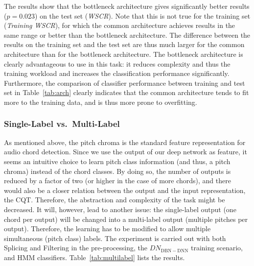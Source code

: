 \documentclass{article}
\begin{document}
The results show that the bottleneck architecture gives significantly better results ($p=0.023$) on the test set (\textit{WSCR}). Note that this is not true for the training set (\textit{Training WSCR}), for which the common architecture achieves results in the same range or better than the bottleneck architecture. The difference between the results on the training set and the test set are thus much larger for the common architecture than for the bottleneck architecture.
The bottleneck architecture is clearly advantageous to use in this task: it reduces complexity and thus the training workload and increases the classification performance significantly. Furthermore, the comparison of classifier performance between training and test set in Table~\ref{tab:arch} clearly indicates that the common architecture tends to fit more to the training data, and is thus more prone to overfitting. 


\subsubsection{Single-Label vs.\ Multi-Label}
As mentioned above, the pitch chroma is the standard feature representation for audio chord detection. Since we use the output of our deep network as feature, it seems an intuitive choice to learn pitch class information (and thus, a pitch chroma) instead of the chord classes. By doing so, the number of outputs is reduced by a factor of two (or higher in the case of more chords), and there would also be a closer relation between the output and the input representation, the CQT. Therefore, the abstraction and complexity of the task might be decreased. It will, however, lead to another issue: the single-label output (one chord per output) will be changed into a multi-label output (multiple pitches per output). Therefore, the learning has to be modified to allow multiple simultaneous (pitch class) labels. 
The experiment is carried out with both Splicing and Filtering in the pre-processing, the $DN_\mathrm{DBN-DNN}$ training scenario, and HMM classifiers. Table~\ref{tab:multilabel} lists the results. 
\end{document}
